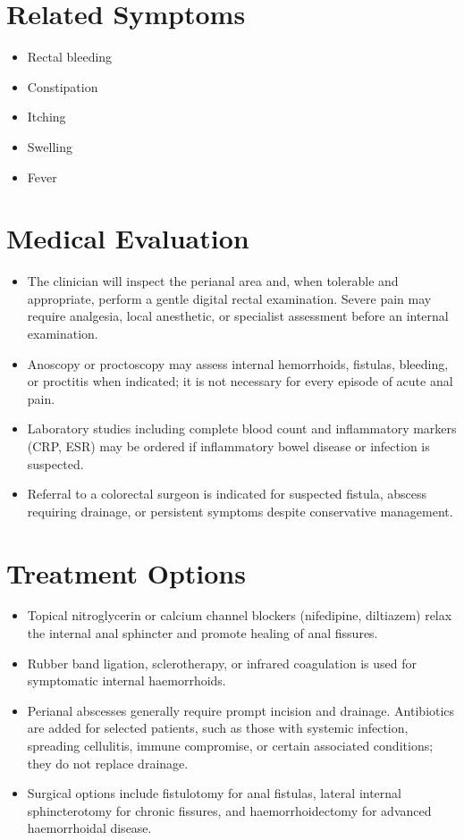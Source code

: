 \section*{Related Symptoms}
\begin{itemize}
 \item Rectal bleeding
 \item Constipation
 \item Itching
 \item Swelling
 \item Fever
\end{itemize}

\section*{Medical Evaluation}
\begin{itemize}
 \item The clinician will inspect the perianal area and, when tolerable and appropriate, perform a gentle digital rectal examination. Severe pain may require analgesia, local anesthetic, or specialist assessment before an internal examination.
 \item Anoscopy or proctoscopy may assess internal hemorrhoids, fistulas, bleeding, or proctitis when indicated; it is not necessary for every episode of acute anal pain.
 \item Laboratory studies including complete blood count and inflammatory markers (CRP, ESR) may be ordered if inflammatory bowel disease or infection is suspected.
 \item Referral to a colorectal surgeon is indicated for suspected fistula, abscess requiring drainage, or persistent symptoms despite conservative management.
\end{itemize}

\section*{Treatment Options}
\begin{itemize}
 \item Topical nitroglycerin or calcium channel blockers (nifedipine, diltiazem) relax the internal anal sphincter and promote healing of anal fissures.
 \item Rubber band ligation, sclerotherapy, or infrared coagulation is used for symptomatic internal haemorrhoids.
 \item Perianal abscesses generally require prompt incision and drainage. Antibiotics are added for selected patients, such as those with systemic infection, spreading cellulitis, immune compromise, or certain associated conditions; they do not replace drainage.
 \item Surgical options include fistulotomy for anal fistulas, lateral internal sphincterotomy for chronic fissures, and haemorrhoidectomy for advanced haemorrhoidal disease.
\end{itemize}

